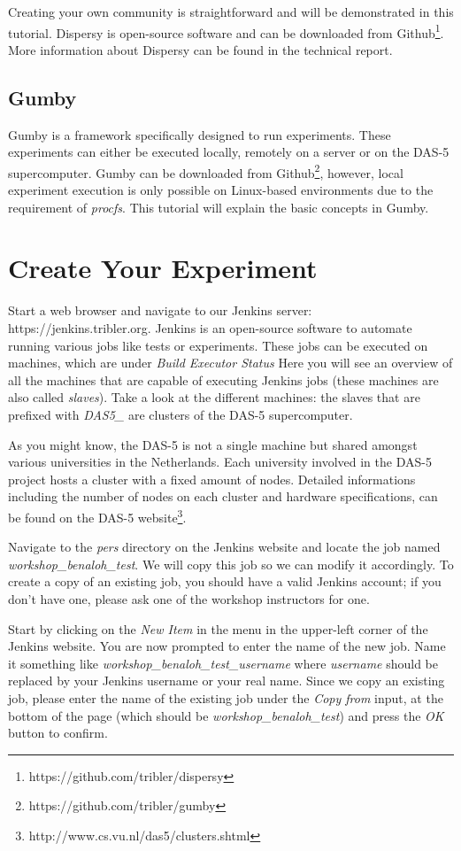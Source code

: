 \documentclass{article}
\begin{document}
Creating your own community is straightforward and will be demonstrated in this tutorial.
Dispersy is open-source software and can be downloaded from Github\footnote{https://github.com/tribler/dispersy}.
More information about Dispersy can be found in the technical report\cite{zeilemaker2013dispersy}.

\subsection{Gumby}
Gumby is a framework specifically designed to run experiments.
These experiments can either be executed locally, remotely on a server or on the DAS-5 supercomputer.
Gumby can be downloaded from Github\footnote{https://github.com/tribler/gumby}, however, local experiment execution is only possible on Linux-based environments due to the requirement of \emph{procfs}.
This tutorial will explain the basic concepts in Gumby.

\section{Create Your Experiment}
\label{sec:create_experiment}
Start a web browser and navigate to our Jenkins server: https://jenkins.tribler.org.
Jenkins is an open-source software to automate running various jobs like tests or experiments.
These jobs can be executed on machines, which are under \emph{Build Executor Status} 
Here you will see an overview of all the machines that are capable of executing Jenkins jobs (these machines are also called \emph{slaves}).
Take a look at the different machines: the slaves that are prefixed with \emph{DAS5\_} are clusters of the DAS-5 supercomputer.

As you might know, the DAS-5 is not a single machine but shared amongst various universities in the Netherlands.
Each university involved in the DAS-5 project hosts a cluster with a fixed amount of nodes.
Detailed informations including the number of nodes on each cluster and hardware specifications, can be found on the DAS-5 website\footnote{http://www.cs.vu.nl/das5/clusters.shtml}.

Navigate to the \emph{pers} directory on the Jenkins website and locate the job named \emph{workshop\_benaloh\_test}.
We will copy this job so we can modify it accordingly.
To create a copy of an existing job, you should have a valid Jenkins account; if you don't have one, please ask one of the workshop instructors for one.

Start by clicking on the \emph{New Item} in the menu in the upper-left corner of the Jenkins website.
You are now prompted to enter the name of the new job.
Name it something like \emph{workshop\_benaloh\_test\_username} where \emph{username} should be replaced by your Jenkins username or your real name.
Since we copy an existing job, please enter the name of the existing job under the \emph{Copy from} input, at the bottom of the page (which should be \emph{workshop\_benaloh\_test}) and press the \emph{OK} button to confirm.
\end{document}

